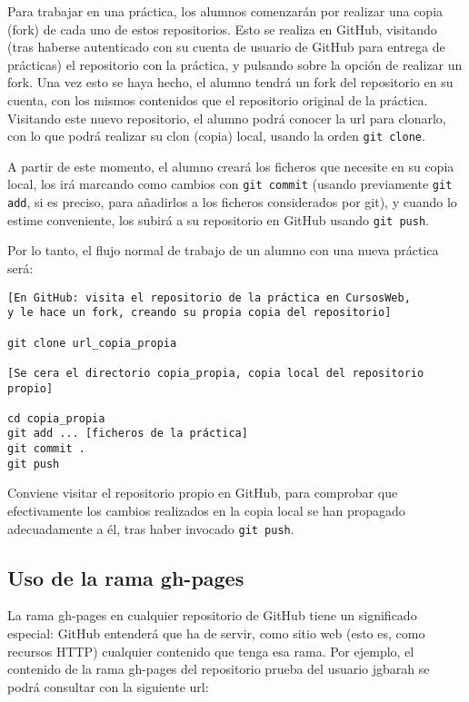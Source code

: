 Para trabajar en una práctica, los alumnos comenzarán por realizar una copia (fork) de cada uno de estos repositorios. Esto se realiza en GitHub, visitando (tras haberse autenticado con su cuenta de usuario de GitHub para entrega de prácticas) el repositorio con la práctica, y pulsando sobre la opción de realizar un fork. Una vez esto se haya hecho, el alumno tendrá un fork del repositorio en su cuenta, con los mismos contenidos que el repositorio original de la práctica. Visitando este nuevo repositorio, el alumno podrá conocer la url para clonarlo, con lo que podrá realizar su clon (copia) local, usando la orden \verb|git clone|.

A partir de este momento, el alumno creará los ficheros que necesite en su copia local, los irá marcando como cambios con \verb|git commit| (usando previamente \verb|git add|, si es preciso, para añadirlos a los ficheros considerados por git), y cuando lo estime conveniente, los subirá a su repositorio en GitHub usando \verb|git push|.

Por lo tanto, el flujo normal de trabajo de un alumno con una nueva práctica será:

\begin{verbatim}
[En GitHub: visita el repositorio de la práctica en CursosWeb,
y le hace un fork, creando su propia copia del repositorio]

git clone url_copia_propia

[Se cera el directorio copia_propia, copia local del repositorio propio]

cd copia_propia
git add ... [ficheros de la práctica]
git commit .
git push
\end{verbatim}

Conviene visitar el repositorio propio en GitHub, para comprobar que efectivamente los cambios realizados en la copia local se han propagado adecuadamente a él, tras haber invocado \verb|git push|.

\subsection{Uso de la rama gh-pages}

La rama gh-pages en cualquier repositorio de GitHub tiene un significado especial: GitHub entenderá que ha de servir, como sitio web (esto es, como recursos HTTP) cualquier contenido que tenga esa rama. Por ejemplo, el contenido de la rama gh-pages del repositorio prueba del usuario jgbarah se podrá consultar con la siguiente url:

